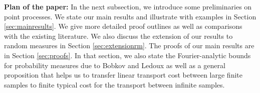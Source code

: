 \documentclass[12pt]{article}
\newcommand{\Leb}{\mathcal{L}}
\newcommand{\ar}{\alpha_2^{!}}
\newcommand{\br}{\beta}%
\newcommand{\1}{\mathbf{1}}
\begin{document}
{\bf Plan of the paper:} In the next subsection, we introduce some preliminaries on point processes. We state our main results and illustrate with examples in Section \ref{sec:mainresults}. We give more detailed proof outlines as well as comparisons with the existing literature. We also discuss the extension of our results to random measures in Section \ref{sec:extensionrm}. The proofs of our main results are in Section \ref{sec:proofs}. In that section, we also state the Fourier-analytic bounds for probability measures due to Bobkov and Ledoux as well as a general proposition that helps us to transfer linear transport cost between large finite samples to finite typical cost for the transport between infinite samples.
%
%
%
%
%
%
\end{document}
